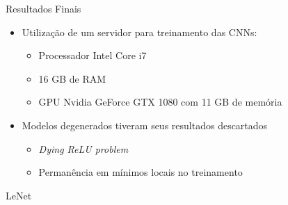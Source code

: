 
\begin{frame}{Resultados Finais}
 \begin{itemize}
   \item Utilização de um servidor para treinamento das CNNs:
    \begin{itemize}
      \item Processador Intel Core i7
      \item 16 GB de RAM
      \item GPU Nvidia GeForce GTX 1080 com 11 GB de memória
    \end{itemize}
    \bigskip
    \item Modelos degenerados tiveram seus resultados descartados
    \begin{itemize}
      \item \emph{Dying ReLU problem}
      \item Permanência em mínimos locais no treinamento
    \end{itemize}
   \end{itemize}
\end{frame}

\begin{frame}{LeNet}

  \begin{table}[h]
    \centering
    \caption{Detalhamento dos melhores resultados obtidos com a arquitetura LeNet.}
    \label{tab:lenet}
    \end{table}

\end{frame}

